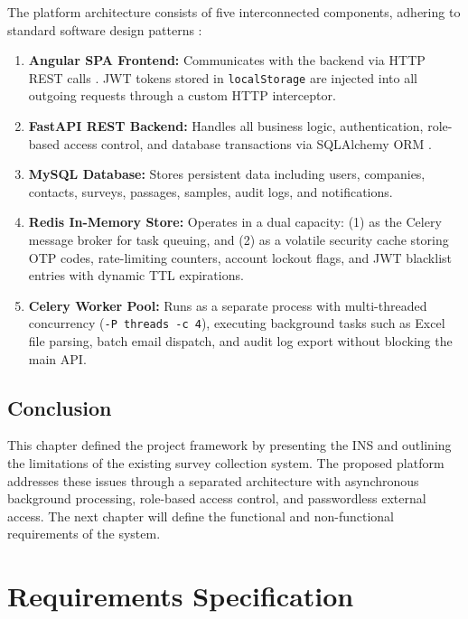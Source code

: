 \documentclass[12pt,a4paper]{report}
\begin{document}
The platform architecture consists of five interconnected components, adhering to standard software design patterns \cite{gamma}:
\begin{enumerate}
    \item \textbf{Angular SPA Frontend:} Communicates with the backend via HTTP REST calls \cite{fielding}. JWT tokens \cite{rfc7519} stored in \texttt{localStorage} are injected into all outgoing requests through a custom HTTP interceptor.
    \item \textbf{FastAPI REST Backend:} Handles all business logic, authentication, role-based access control, and database transactions via SQLAlchemy ORM \cite{sqlalchemy}.
    \item \textbf{MySQL Database:} Stores persistent data including users, companies, contacts, surveys, passages, samples, audit logs, and notifications.
    \item \textbf{Redis In-Memory Store:} Operates in a dual capacity: (1) as the Celery message broker for task queuing, and (2) as a volatile security cache storing OTP codes, rate-limiting counters, account lockout flags, and JWT blacklist entries with dynamic TTL expirations.
    \item \textbf{Celery Worker Pool:} Runs as a separate process with multi-threaded concurrency (\texttt{-P threads -c 4}), executing background tasks such as Excel file parsing, batch email dispatch, and audit log export without blocking the main API.
\end{enumerate}

\section{Conclusion}
This chapter defined the project framework by presenting the INS and outlining the limitations of the existing survey collection system. The proposed platform addresses these issues through a separated architecture with asynchronous background processing, role-based access control, and passwordless external access. The next chapter will define the functional and non-functional requirements of the system.

\chapter{Requirements Specification}
\end{document}
